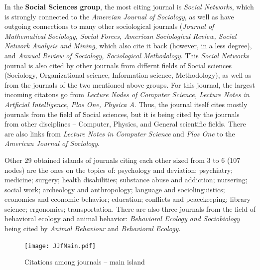 \documentclass[11pt]{article} %
\begin{document}
In the \textbf{Social Sciences group}, the most citing journal is \textit{Social Networks}, which is strongly connected to the \textit{Amercian Journal of Sociology}, as well as have outgoing connections to many other sociological journals (\textit{Journal of Mathematical Sociology, Social Forces, American Sociological Review, Social Network Analysis and Mining}, which also cite it back (however, in a less degree), and \textit{Annual Review of Sociology, Sociological Methodology}. This \textit{Social Networks} journal is also cited by other journals from differnt fields of Social sciences (Sociology, Organizational science, Information science, Methodology), as well as from the journals of the two mentioned above groups. For this journal, the largest incoming citatons go from \textit{Lecture Nodes of Computer Science,  Lecture Notes in Artficial Intelligence, Plos One, Physica A}. Thus, the journal itself cites mostly journals from the field of Social sciences, but it is being cited by the journals from other disciplines -- Computer, Physics, and General scientific fields. There are also links from \textit{Lecture Notes in Computer Science} and \textit{Plos One} to  the \textit{American Journal of Sociology}. \medskip  \medskip 

Other 29 obtained islands of journals citing each other sized from 3 to 6 (107 nodes) are the ones on the topics of: psychology and deviation;  psychiatry; medicine; surgery; health disabilities; substance abuse and addiction; nursering; social work; archeology and anthropology; language and sociolinguistics; economics and economic behavior; education; conflicts and peacekeeping; library science; ergonomics; transportation. There are also three journals from the field of behavioral ecology and animal behavior: \textit{Behavioral Ecology and Sociobiology} being cited by \textit{Animal Behaviour} and \textit{Behavioral Ecology}. \medskip 
 
\begin{figure}
\begin{center}
\texttt{[image: JJfMain.pdf]}
\end{center}
\caption{Citations among journals -- main island} \label{jjFmain}
\end{figure}
\end{document}
